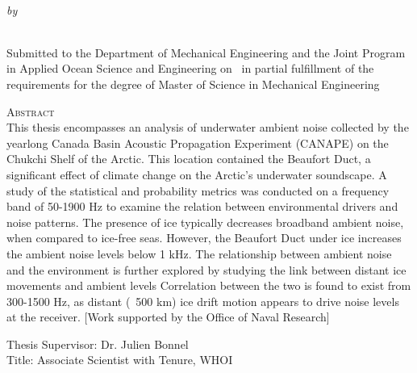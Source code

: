 \begin{center}
{\large \@title} \\
\emph{\footnotesize by} \\
\@author \\
\end{center}

\vspace{-1em}

\begin{center}
\begin{singlespace}
{\parindent0pt
\small
Submitted to the Department of Mechanical Engineering and the Joint Program in Applied Ocean Science and Engineering on \@date ~in partial fulfillment of the requirements for the degree of Master of Science in Mechanical Engineering}
\end{singlespace}
\end{center}

\begin{singlespace}
{\parindent0pt 
{\large \textsc{Abstract}} \\ %
This thesis encompasses an analysis of underwater ambient noise collected by the yearlong Canada Basin Acoustic Propagation Experiment (CANAPE) on the Chukchi Shelf of the Arctic. This location contained the Beaufort Duct, a significant effect of climate change on the Arctic's underwater soundscape. A study of the statistical and probability metrics was conducted on a frequency band of 50-1900 Hz to examine the relation between environmental drivers and noise patterns. The presence of ice typically decreases broadband ambient noise, when compared to ice-free seas. However, the Beaufort Duct under ice increases the ambient noise levels below 1 kHz. The relationship between ambient noise and the environment is further explored by studying the link between distant ice movements and ambient levels Correlation between the two is found to exist from 300-1500 Hz, as distant (~500 km) ice drift motion appears to drive noise levels at the receiver. [Work supported by the Office of Naval Research]


\noindent Thesis Supervisor: Dr. Julien Bonnel \\
\noindent Title: Associate Scientist with Tenure, WHOI
}
\end{singlespace}

\newpage
\null
\newpage